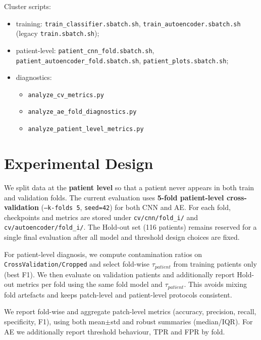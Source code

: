 \documentclass[11pt,a4paper]{article}
\begin{document}
Cluster scripts:
\begin{itemize}
  \item training: \texttt{train\_classifier.sbatch.sh}, \texttt{train\_autoencoder.sbatch.sh} (legacy \texttt{train.sbatch.sh});
  \item patient-level: \texttt{patient\_cnn\_fold.sbatch.sh}, \texttt{patient\_autoencoder\_fold.sbatch.sh}, \texttt{patient\_plots.sbatch.sh};
  \item diagnostics:
  \begin{itemize}
    \item \texttt{analyze\_cv\_metrics.py}
    \item \texttt{analyze\_ae\_fold\_diagnostics.py}
    \item \texttt{analyze\_patient\_level\_metrics.py}
  \end{itemize}
\end{itemize}

\section{Experimental Design}
\label{sec:experiments}

We split data at the \textbf{patient level} so that a patient never appears in both train and validation folds. The current evaluation uses \textbf{5-fold patient-level cross-validation} (\texttt{--k-folds 5}, \texttt{seed=42}) for both CNN and AE. For each fold, checkpoints and metrics are stored under \texttt{cv/cnn/fold\_i/} and \texttt{cv/autoencoder/fold\_i/}. The Hold-out set (116 patients) remains reserved for a single final evaluation after all model and threshold design choices are fixed.

For patient-level diagnosis, we compute contamination ratios on \texttt{CrossValidation/Cropped} and select fold-wise $\tau_{patient}$ from training patients only (best F1). We then evaluate on validation patients and additionally report Hold-out metrics per fold using the same fold model and $\tau_{patient}$. This avoids mixing fold artefacts and keeps patch-level and patient-level protocols consistent.

We report fold-wise and aggregate patch-level metrics (accuracy, precision, recall, specificity, F1), using both mean$\pm$std and robust summaries (median/IQR). For AE we additionally report threshold behaviour, TPR and FPR by fold.
\end{document}
